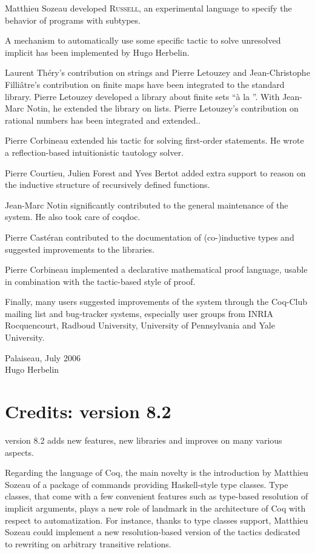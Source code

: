 Matthieu Sozeau developed \textsc{Russell}, an experimental language
to specify the behavior of programs with subtypes.

A mechanism to automatically use some specific tactic to solve
unresolved implicit has been implemented by Hugo Herbelin.

Laurent Théry's contribution on strings and Pierre Letouzey and
Jean-Christophe Filliâtre's contribution on finite maps have been
integrated to the {\Coq} standard library. Pierre Letouzey developed a
library about finite sets ``à la {\ocaml}''. With Jean-Marc
Notin, he extended the library on lists. Pierre Letouzey's
contribution on rational numbers has been integrated and extended..

Pierre Corbineau extended his tactic for solving first-order
statements. He wrote a reflection-based intuitionistic tautology
solver.

Pierre Courtieu, Julien Forest and Yves Bertot added extra support to
reason on the inductive structure of recursively defined functions.

Jean-Marc Notin significantly contributed to the general maintenance
of the system. He also took care of {\textsf{coqdoc}}.

Pierre Castéran contributed to the documentation of (co-)inductive
types and suggested improvements to the libraries.

Pierre Corbineau implemented a declarative mathematical proof
language, usable in combination with the tactic-based style of proof.

Finally, many users suggested improvements of the system through the
Coq-Club mailing list and bug-tracker systems, especially user groups
from INRIA Rocquencourt, Radboud University, University of
Pennsylvania and Yale University.

\enlargethispage{\baselineskip}
\begin{flushright}
Palaiseau, July 2006\\
Hugo Herbelin
\end{flushright}

\section*{Credits: version 8.2}

{\Coq} version 8.2 adds new features, new libraries and 
improves on many various aspects.

Regarding the language of Coq, the main novelty is the introduction by
Matthieu Sozeau of a package of commands providing Haskell-style
type classes. Type classes, that come with a few convenient features
such as type-based resolution of implicit arguments, plays a new role
of landmark in the architecture of Coq with respect to automatization.
For instance, thanks to type classes support, Matthieu Sozeau could
implement a new resolution-based version of the tactics dedicated to
rewriting on arbitrary transitive relations.

